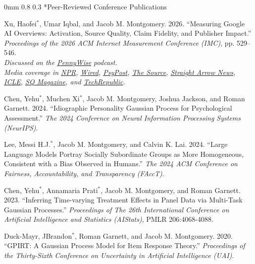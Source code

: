 \documentclass[10pt]{article}
\makeatletter
\renewcommand{\subsection}{\@startsection{subsection}{2}
{0mm}
{0.8\baselineskip}
{0.3\baselineskip}
{\normalsize\scshape}}
\renewenvironment{CV}
  {\begin{list}{}
    {\renewcommand{\makelabel}{\entrylabel}
    \setlength{\labelwidth}{55pt}
    \setlength{\leftmargin}{62pt}
  }}
  {\end{list}}
\newcommand{\cvnote}[1]{\\[0.1em]{\hspace*{0.5em}\small\itshape #1}}
\newcommand{\student}[1]{#1$^{*}$}
\makeatother
\begin{document}
\subsection*{Peer-Reviewed Conference Publications}

\begin{CV}

\item[] \student{Xu, Haofei}, Umar Iqbal, and Jacob M. Montgomery. 2026. ``Measuring Google AI Overviews: Activation, Source Quality, Claim Fidelity, and Publisher Impact.'' \emph{Proceedings of the 2026 ACM Internet Measurement Conference (IMC)}, pp. 529--546.\cvnote{Discussed on the \href{https://podcasts.apple.com/us/podcast/pennywise-personal-finance-travel-tips/id1550653869?i=1000799092798}{PennyWise} podcast.}
\cvnote{Media coverage in \href{https://www.npr.org/2026/08/30/nx-s1-5876436/chatbots-search-propaganda}{NPR}, \href{https://www.wired.com/story/google-is-forcing-ai-overviews-in-classrooms-schools-are-searching-for-a-way-out/}{Wired}, \href{https://www.psypost.org/how-google-ai-search-summaries-alter-online-information-and-publisher-revenue/}{PsyPost}, \href{https://source.washu.edu/2026/09/washu-research-finds-gaps-in-google-ai-overview-citations-claims/}{The Source}, \href{https://san.com/cc/googles-shift-to-ai-powered-search-results-may-be-the-final-knife-in-the-back-of-digital-media/}{Straight Arrow News}, \href{https://laweconcenter.org/resources/groundhog-day-for-publishers-ai-overviews-copyright-and-competition/}{ICLE}, \href{https://sqmagazine.co.uk/ai-overviews-statistics/}{SQ Magazine}, and \href{https://www.techrepublic.com/article/news-google-ai-overviews-legal-risks/}{TechRepublic}.}

\item[] \student{Chen, Yehu},  \student{Muchen Xi}, Jacob M. Montgomery, Joshua Jackson, and Roman Garnett. 2024. ``Idiographic Personality Gaussian Process for Psychological Assessment.''  \emph{The 2024 Conference on Neural Information Processing Systems (NeurIPS)}.

\item[]  \student{Lee, Messi H.J.}, Jacob M. Montgomery, and Calvin
   K. Lai.  2024. ``Large Language Models Portray
   Socially Subordinate Groups as More Homogeneous, Consistent with a
   Bias Observed in Humans.'' \emph{The 2024 ACM Conference on
     Fairness, Accountability, and Transparency (FAccT)}.

\item[] \student{Chen, Yehu}, \student{Annamaria Prati},  Jacob M.
  Montgomery,  and Roman Garnett.  2023. ``Inferring Time-varying
  Treatment Effects in Panel Data via Multi-Task Gaussian Processes.''
  \textit{Proceedings of The 26th International Conference on
    Artificial Intelligence and Statistics (AIStats)}, PMLR 206:4068-4088.

\item[] \student{Duck-Mayr, JBrandon}, Roman Garnett, and
  Jacob M. Montgomery. 2020. ``GPIRT: A Gaussian Process Model for
  Item Response Theory.'' \emph{Proceedings of the Thirty-Sixth
    Conference on Uncertainty in Artificial Intelligence (UAI)}.

\end{CV}
\end{document}
